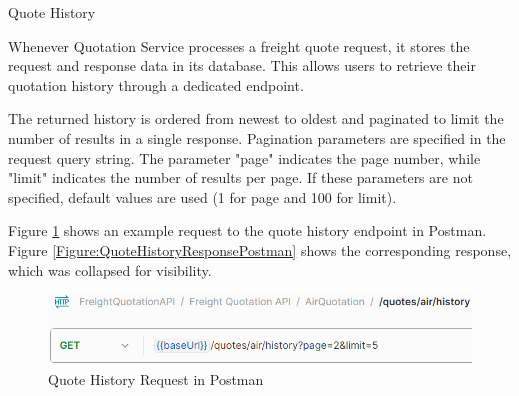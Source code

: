 \documentclass[12pt, reqno]{amsbook}
\makeatletter
\def\subsection{\@startsection{subsection}{2}%
      \z@{.5\linespacing\@plus.7\linespacing}{.25\linespacing}%
      {\normalfont\bfseries\flushleft}}
\theoremstyle{definition}
\theoremstyle{definition}
\numberwithin{section}{chapter}
\numberwithin{table}{chapter}
\numberwithin{figure}{chapter}
\makeatother
\begin{document}
\subsection{Quote History}
\label{Subsection:Quote_History}

Whenever Quotation Service processes a freight quote request, it stores the request and response data in its database. This allows users to retrieve their quotation history through a dedicated endpoint.

The returned history is ordered from newest to oldest and paginated to limit the number of results in a single response. Pagination parameters are specified in the request query string. The parameter "page" indicates the page number, while "limit" indicates the number of results per page. If these parameters are not specified, default values are used (1 for page and 100 for limit).

Figure \ref{Figure:QuoteHistoryRequestPostman} shows an example request to the quote history endpoint in Postman. Figure \ref{Figure:QuoteHistoryResponsePostman} shows the corresponding response, which was collapsed for visibility.

\begin{figure}[H]
  \centering
  \includegraphics[width=0.8\linewidth]{images/QuoteHistoryRequestPostman.png}
  \caption{\label{Figure:QuoteHistoryRequestPostman}Quote History Request in Postman}
\end{figure}
\end{document}
